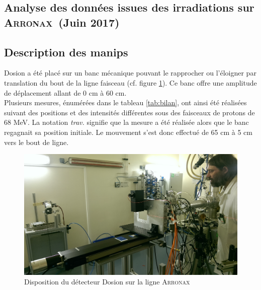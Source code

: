 \documentclass[a4paper,11pt]{article}
\newcommand{\arronax}{\textsc{Arronax}}
\begin{document}
\setmarginsrb{3.5cm}{1.5cm}{1.5cm}{2cm}{2ex}{3ex}{2ex}{5ex}
%
\lhead[]{}
\fancyfoot[C]{}
\fancyfoot[R]{\thepage}

\begin{center}
\subsection*{Analyse des données issues des irradiations sur \arronax\ (Juin 2017)}
\end{center}

\subsection*{Description des manips}
Dosion a été placé sur un banc mécanique pouvant le rapprocher ou l'éloigner par translation du bout de la ligne faisceau (cf. figure \ref{fig:manip}).
Ce banc offre une amplitude de déplacement allant de 0 cm à 60 cm.\\
Plusieurs mesures, énumérées dans le tableau \ref{tab:bilan}, ont ainsi été réalisées suivant des positions et des intensités différentes sous des faisceaux de protons de 68 MeV.
La notation \textit{trav.} signifie que la mesure a été réalisée alors que le banc regagnait sa position initiale.
Le mouvement s'est donc effectué de 65 cm à 5 cm vers le bout de ligne.

\begin{figure}[h]
\begin{center}
\includegraphics[width=0.8\linewidth]{Manip.jpg} 
\caption{\label{fig:manip}\footnotesize{Disposition du détecteur Dosion sur la ligne \arronax }}
\end{center}
\end{figure}
\end{document}

